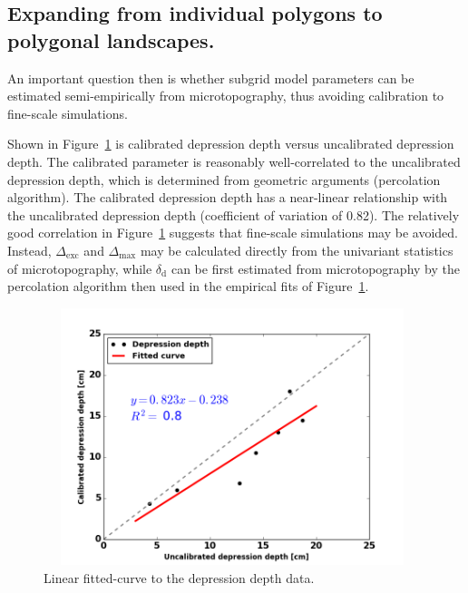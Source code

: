 \subsection{Expanding from individual polygons to polygonal landscapes.}
%
An important question then is whether subgrid model parameters can be estimated semi-empirically from microtopography, thus avoiding calibration to fine-scale simulations.

Shown in Figure~\ref{curvefit-dd-manning} is calibrated depression depth versus uncalibrated depression depth.
The calibrated parameter is reasonably well-correlated to the uncalibrated depression depth, which is determined from geometric arguments (percolation algorithm).
The calibrated depression depth has a near-linear relationship with the uncalibrated depression depth (coefficient of variation of 0.82). 
The relatively good correlation in Figure~\ref{curvefit-dd-manning} suggests that fine-scale simulations may be avoided.
Instead, $\Delta_\text{exc}$ and $\Delta_\text{max}$ may be calculated directly from the univariant statistics of microtopography, while $\delta_\text{d}$ can be first estimated from microtopography by the percolation algorithm then used in the empirical fits of Figure~\ref{curvefit-dd-manning}.
%
\begin{figure}[!h]
\centering
\includegraphics[width=11cm, height=7.5cm]{./figures/fittedcurve-dd-1.png}
\caption{Linear fitted-curve to the depression depth data.}
\label{curvefit-dd-manning}
\end{figure}
%

